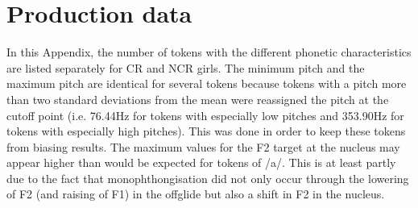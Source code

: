 \chapter{Production data}\label{appen:proddata}

In this Appendix, the number of tokens with the different phonetic characteristics are listed separately for CR and NCR girls.  The minimum pitch and the maximum pitch are identical for several tokens because tokens with a pitch more than two standard deviations from the mean were reassigned the pitch at the cutoff point (i.e. 76.44Hz for tokens with especially low pitches and 353.90Hz for tokens with especially high pitches).  This was done in order to keep these tokens from biasing results.  The maximum values for the F2 target at the nucleus may appear higher than would be expected for tokens of /a/.  This is at least partly due to the fact that monophthongisation did not only occur through the lowering of F2 (and raising of F1) in the offglide but also a shift in F2 in the nucleus.  

